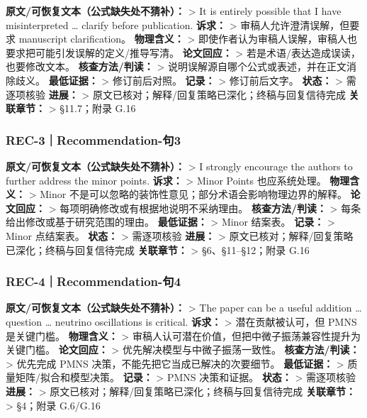 \documentclass[
  chinese,
  UTF8]{ctexart}
\begin{document}
\textbf{原文/可恢复文本（公式缺失处不猜补）：} \textgreater{} It is
entirely possible that I have misinterpreted \ldots{} clarify before
publication. \textbf{诉求：} \textgreater{} 审稿人允许澄清误解，但要求
manuscript clarification。 \textbf{物理含义：} \textgreater{}
即使作者认为审稿人误解，审稿人也要求把可能引发误解的定义/推导写清。
\textbf{论文回应：} \textgreater{} 若是术语/表达造成误读，也要修改文本。
\textbf{核查方法/判读：} \textgreater{}
说明误解源自哪个公式或表述，并在正文消除歧义。 \textbf{最低证据：}
\textgreater{} 修订前后对照。 \textbf{记录：} \textgreater{}
修订前后文字。 \textbf{状态：} \textgreater{} 需逐项核验 \textbf{进展：}
\textgreater{} 原文已核对；解释/回复策略已深化；终稿与回复信待完成
\textbf{关联章节：} \textgreater{} §11.7；附录 G.16

\subsubsection{REC-3｜Recommendation-句3}\label{rec-3recommendation-ux53e53}

\textbf{原文/可恢复文本（公式缺失处不猜补）：} \textgreater{} I strongly
encourage the authors to further address the minor points.
\textbf{诉求：} \textgreater{} Minor Points 也应系统处理。
\textbf{物理含义：} \textgreater{} Minor
不是可以忽略的装饰性意见；部分术语会影响物理边界的解释。
\textbf{论文回应：} \textgreater{}
每项明确修改或有根据地说明不采纳理由。 \textbf{核查方法/判读：}
\textgreater{} 每条给出修改或基于研究范围的理由。 \textbf{最低证据：}
\textgreater{} Minor 结案表。 \textbf{记录：} \textgreater{} Minor
点结案表。 \textbf{状态：} \textgreater{} 需逐项核验 \textbf{进展：}
\textgreater{} 原文已核对；解释/回复策略已深化；终稿与回复信待完成
\textbf{关联章节：} \textgreater{} §6、§11--§12；附录 G.16

\subsubsection{REC-4｜Recommendation-句4}\label{rec-4recommendation-ux53e54}

\textbf{原文/可恢复文本（公式缺失处不猜补）：} \textgreater{} The paper
can be a useful addition \ldots{} question \ldots{} neutrino
oscillations is critical. \textbf{诉求：} \textgreater{}
潜在贡献被认可，但 PMNS 是关键门槛。 \textbf{物理含义：} \textgreater{}
审稿人认可潜在价值，但把中微子振荡兼容性提升为关键门槛。
\textbf{论文回应：} \textgreater{} 优先解决模型与中微子振荡一致性。
\textbf{核查方法/判读：} \textgreater{} 优先完成 PMNS
决策，不能先把它当成已解决的次要细节。 \textbf{最低证据：}
\textgreater{} 质量矩阵/拟合和模型决策。 \textbf{记录：} \textgreater{}
PMNS 决策和证据。 \textbf{状态：} \textgreater{} 需逐项核验
\textbf{进展：} \textgreater{}
原文已核对；解释/回复策略已深化；终稿与回复信待完成 \textbf{关联章节：}
\textgreater{} §4；附录 G.6/G.16
\end{document}
